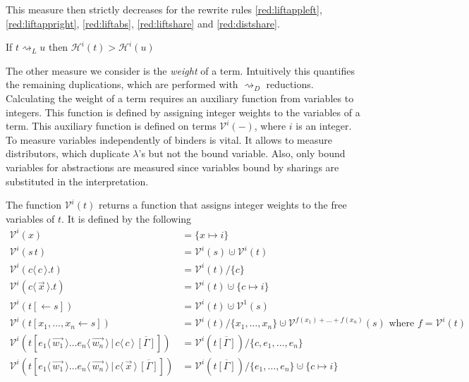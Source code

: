 \documentclass[a4paper,UKenglish,cleveref, autoref]{lipics-v2019}
\newcommand{\set}[1]{ \{ #1 \} }
\newcommand{\app}[2]{#1 \, #2}
\newcommand{\fake}[3]{#1 \langle \, #2 \, \rangle . #3}
\newcommand{\share}[3]{#1 [#2 \leftarrow #3]}
\newcommand{\dist}[5]{#1 [ #2 \, \vert \, \fakedist{#4}{#5} \, #3 ]}
\newcommand{\fakedist}[2]{#1 \langle \, #2 \, \rangle}
\newcommand{\height}[2]{\mathcal{H}^{#1}(#2)}
\newcommand{\weightvar}[2]{\mathcal{V}^{#1}(#2)}
\begin{document}
\noindent This measure then strictly decreases for the rewrite rules \ref{red:liftappleft}, \ref{red:liftappright}, \ref{red:liftabs}, \ref{red:liftshare} and \ref{red:distshare}.

\begin{lemma}
\label{theo:liftingheight}
If $t \rightsquigarrow_{L} u$ then $\height{i}{t} > \height{i}{u}$
\end{lemma}

The other measure we consider is the \emph{weight} of a term. Intuitively this quantifies the remaining duplications, which are performed with $\rightsquigarrow_{D}$ reductions. Calculating the weight of a term requires an auxiliary function from variables to integers. This function is defined by assigning integer weights to the variables of a term. This auxiliary function is defined on terms $\weightvar{i}{-}$, where $i$ is an integer. To measure variables independently of binders is vital. It allows to measure distributors, which duplicate $\lambda$'s but not the bound variable. Also, only bound variables for abstractions are measured since variables bound by sharings are substituted in the interpretation.

\begin{definition}
The function $\weightvar{i}{t}$ returns a function that assigns integer weights to the free variables of $t$. It is defined by the following
\begin{align*}
	\weightvar{i}{x} &= \set{x \mapsto i} \\
	\weightvar{i}{\app{s}{t}} &= \weightvar{i}{s} \cupdot \weightvar{i}{t} \\
	\weightvar{i}{\fake{c}{c}{t}} &= \weightvar{i}{t} / \set{c} \\
	\weightvar{i}{\fake{c}{\vec{x}}{t}} &= \weightvar{i}{t} \cupdot \set{c \mapsto i} \\
	\weightvar{i}{\share{t}{}{s}} &= \weightvar{i}{t} \cupdot \weightvar{1}{s} \\
	\weightvar{i}{\share{t}{x_{1}, \dots, x_{n}}{s}} &= \weightvar{i}{t} / \set{x_{1}, \dots, x_{n}} \cupdot \weightvar{f(x_{1}) + \dots + f(x_{n})}{s} \text{ where } f = \weightvar{i}{t} \\
	\weightvar{i}{\dist{t}{\fakedist{e_{1}}{\vec{w_{1}}} \dots \fakedist{e_{n}}{\vec{w_{n}}}}{\overline{[\Gamma]}}{c}{c}} &= \weightvar{i}{t\overline{[\Gamma]}} / \set{c, e_{1}, \dots, e_{n}} \\
	\weightvar{i}{\dist{t}{\fakedist{e_{1}}{\vec{w_{1}}} \dots \fakedist{e_{n}}{\vec{w_{n}}}}{\overline{[\Gamma]}}{c}{\vec{x}}} &= \weightvar{i}{t\overline{[\Gamma]}} / \set{e_{1}, \dots, e_{n}} \cupdot \set{c \mapsto i}
\end{align*}
\end{definition}
\end{document}
